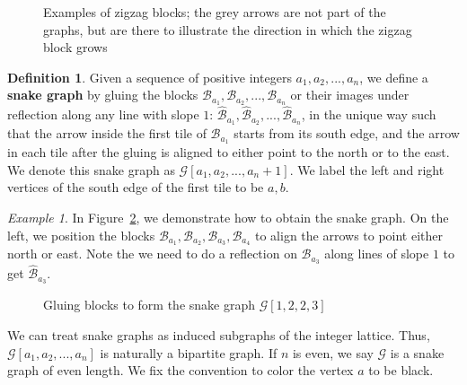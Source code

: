 \documentclass[11pt]{amsart}
\theoremstyle{definition}
\newtheorem{defn}[thm]{Definition}
\theoremstyle{remark}
\newtheorem{exmp}[thm]{Example}
\numberwithin{equation}{section}
\newcommand{\calG}{\mathcal{G}}
\begin{document}
\begin{figure}[h!]
    \centering
    
    \caption{Examples of zigzag blocks; the grey arrows are not part of the graphs, but are there to illustrate the direction in which the zigzag block grows}
    \label{fig:small_examples_of_zigzag_blocks}
    \end{figure}

\begin{defn}\label{def: snake_graphs}
    Given a sequence of positive integers $a_1,a_2,...,a_n$, we define a \textbf{snake graph} by gluing the blocks $\mathcal{B}_{a_1}, \mathcal{B}_{a_2},...,\mathcal{B}_{a_n}$ or their images under reflection along any line with slope $1$: $\hat{\mathcal{B}}_{a_1}, \hat{\mathcal{B}}_{a_2},...,\hat{\mathcal{B}}_{a_n}$, in the unique way such that the arrow inside the first tile of $\mathcal{B}_{a_1}$ starts from its south edge, and the arrow in each tile after the gluing is aligned to either point to the north or to the east. We denote this snake graph as $\mathcal{G}[a_1,a_2,...,a_n+1]$. We label the left and right vertices of the south edge of the first tile to be $a,b$. 
\end{defn}

\begin{exmp}\label{exmp:snake_graph}
    In Figure~\ref{fig:gluing_blocks_to_snake}, we demonstrate how to obtain the snake graph. On the left, we position the blocks $\mathcal{B}_{a_1}, \mathcal{B}_{a_2}, \mathcal{B}_{a_3}, \mathcal{B}_{a_4}$ to align the arrows to point either north or east. Note the we need to do a reflection on $\mathcal{B}_{a_3}$ along lines of slope $1$ to get $\hat{\mathcal{B}}_{a_3}$. 
    \begin{figure}[h!]
    \centering
    
    \caption{Gluing blocks to form the snake graph $\mathcal{G}[1,2,2,3]$}
    \label{fig:gluing_blocks_to_snake}
    \end{figure}
\end{exmp}

We can treat snake graphs as induced subgraphs of the integer lattice. Thus, $\mathcal{G}[a_1,a_2,...,a_n]$ is naturally a bipartite graph. If $n$ is even, we say $\mathcal{G}$ is a snake graph of even length. We fix the convention to color the vertex $a$ to be black.


\end{document}
